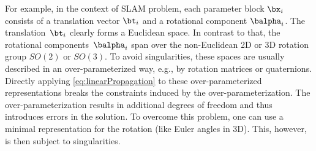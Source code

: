 \documentclass[a4paper]{article}
\begin{document}
For example, in the context of SLAM problem, each parameter block
$\bx_i$ consists of a translation vector $\bt_i$ and a rotational
component $\balpha_i$. The translation~$\bt_i$ clearly forms a Euclidean
space. In contrast to that, the rotational components~$\balpha_i$ span
over the non-Euclidean 2D or 3D rotation group $SO(2)$ or $SO(3)$.  To
avoid singularities, these spaces are usually described in an
over-parameterized way, e.g., by rotation matrices or quaternions.
Directly applying \eqref{eq:linearPropagation} to these
over-parameterized representations breaks the constraints induced by the
over-parameterization. The over-parameterization results in additional
degrees of freedom and thus introduces errors in the solution.  To
overcome this problem, one can use a minimal representation for the
rotation (like Euler angles in 3D). This, however, is then subject to
singularities.
\end{document}
